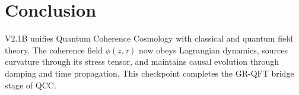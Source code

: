 \documentclass[11pt]{article}
\begin{document}
\section{Conclusion}
V2.1B unifies Quantum Coherence Cosmology with classical and quantum field theory. The coherence field \( \phi(z, \tau) \) now obeys Lagrangian dynamics, sources curvature through its stress tensor, and maintains causal evolution through damping and time propagation. This checkpoint completes the GR-QFT bridge stage of QCC.
\end{document}
